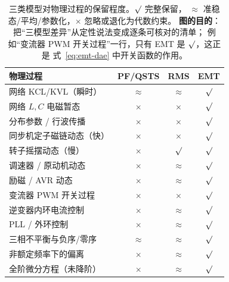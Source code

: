 \begin{table}[htbp]
\centering
\small
\renewcommand{\arraystretch}{1.15}
\begin{tabular}{@{}lccc@{}}
\toprule
物理过程 & PF/QSTS & RMS & EMT \\
\midrule
网络 KCL/KVL（瞬时） & \cellcolor{yellow!40}$\approx$ & \cellcolor{yellow!40}$\approx$ & \cellcolor{green!25}$\surd$ \\
网络 $L,C$ 电磁暂态 & \cellcolor{red!15}$\times$ & \cellcolor{red!15}$\times$ & \cellcolor{green!25}$\surd$ \\
分布参数 / 行波传播 & \cellcolor{red!15}$\times$ & \cellcolor{red!15}$\times$ & \cellcolor{green!25}$\surd$ \\
同步机定子磁链动态（快） & \cellcolor{red!15}$\times$ & \cellcolor{red!15}$\times$ & \cellcolor{green!25}$\surd$ \\
转子摇摆动态（慢） & \cellcolor{red!15}$\times$ & \cellcolor{green!25}$\surd$ & \cellcolor{green!25}$\surd$ \\
调速器 / 原动机动态 & \cellcolor{red!15}$\times$ & \cellcolor{yellow!40}$\approx$ & \cellcolor{green!25}$\surd$ \\
励磁 / AVR 动态 & \cellcolor{red!15}$\times$ & \cellcolor{yellow!40}$\approx$ & \cellcolor{green!25}$\surd$ \\
变流器 PWM 开关过程 & \cellcolor{red!15}$\times$ & \cellcolor{red!15}$\times$ & \cellcolor{green!25}$\surd$ \\
逆变器内环电流控制 & \cellcolor{red!15}$\times$ & \cellcolor{yellow!40}$\approx$ & \cellcolor{green!25}$\surd$ \\
PLL / 外环控制 & \cellcolor{red!15}$\times$ & \cellcolor{yellow!40}$\approx$ & \cellcolor{green!25}$\surd$ \\
三相不平衡与负序/零序 & \cellcolor{yellow!40}$\approx$ & \cellcolor{yellow!40}$\approx$ & \cellcolor{green!25}$\surd$ \\
非额定频率下的偏离 & \cellcolor{red!15}$\times$ & \cellcolor{yellow!40}$\approx$ & \cellcolor{green!25}$\surd$ \\
全阶微分方程（未降阶） & \cellcolor{red!15}$\times$ & \cellcolor{yellow!40}$\approx$ & \cellcolor{green!25}$\surd$ \\
\bottomrule
\end{tabular}
\caption{三类模型对物理过程的保留程度。$\surd$ 完整保留，
$\approx$ 准稳态/平均/参数化，$\times$ 忽略或退化为代数约束。
\textbf{图的目的}：把“三模型差异”从定性说法变成逐条可核对的清单；
例如“变流器 PWM 开关过程”一行，只有 EMT 是 $\surd$，这正是
式~\eqref{eq:emt-dae} 中开关函数的作用。}
\label{tab:retention}
\end{table}

